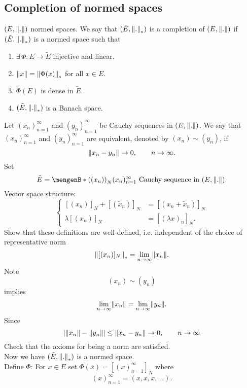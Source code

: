 \subsection{Completion of normed spaces} 
\label{sub:completion_of_normed_spaces}
$(E,\norm{.})$ normed spaces. We say that $(\tilde E, \norm{.}_*)$ is a completion of $(E,\norm{.})$ if $(\tilde E, \norm{.}_*)$ is a normed space such that
\begin{enumerate}[(1)]
	\item $\exists\, \Phi: E \to \tilde E$ injective and linear.
	\item $\norm{x} = \norm{\Phi(x)}_*$ for all $x \in E$.
	\item $\Phi(E)$ is dense in $\tilde E$.
	\item $(\tilde E, \norm{.}_*)$ is a Banach space.
\end{enumerate}
Let $(x_n)_{n=1}^{\infty}$ and $(y_n)_{n=1}^{\infty}$ be Cauchy sequences in $(E,\norm{.})$. We say that $(x_n)_{n=1}^{\infty}$ and $(y_n)_{n=1}^{\infty}$ are equivalent, denoted by $(x_n) \sim (y_n)$, if 
\[
	\norm{x_n-y_n} \to 0, \qquad n \to \infty.
\]
Set \[
	\tilde E= \set[ \left((x_n) \right)_N]{(x_n)_{n=1}^{\infty} \text{ Cauchy sequence in } (E,\norm{.})}.
\]
Vector space structure:
\[
	\begin{cases}
		[(x_n)]_N + [(\tilde x_n)]_N &= [(x_n + \tilde x_n)]_N \\
		\lambda [(x_n)]_N &= [(\lambda x)_n]_N.
	\end{cases}
\]
Show that these definitions are well-defined, i.e. independent of the choice of representative norm
\[
	\norm{ [(x_n)]_N}_* = \lim_{n \to \infty} \norm{x_n}.
\]
Note \[
	(x_n) \sim (y_n)
\]
implies
\[
	\lim_{n \to \infty}\norm{x_n} = \lim_{n \to \infty} \norm{y_n}.
\]
Since
\[
	\abs{\norm{x_n}- \norm{y_n}} \leq \norm{x_n-y_n} \to 0, \qquad n \to \infty
\]
Check that the axioms for being a norm are satisfied. \\
Now we have $(\tilde E,\norm{.}_*)$ is a normed space. \\
Define $\Phi$: For $x \in E$ set $\Phi(x) = \left[ (x)_{n=1}^{\infty} \right]_N$ where 
\[
	(x)_{n=1}^{\infty} = (x,x,x, \dots).
\]
